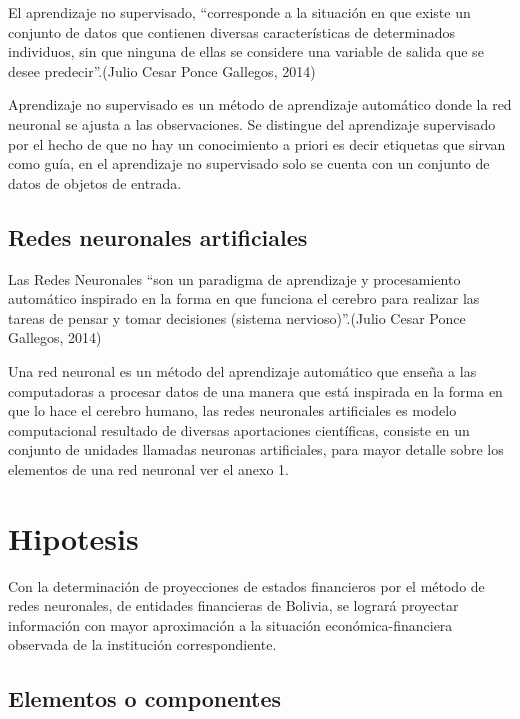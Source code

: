 \documentclass[
  12pt,
]{article}
\begin{document}
El aprendizaje no supervisado, ``corresponde a la situación en que
existe un conjunto de datos que contienen diversas características de
determinados individuos, sin que ninguna de ellas se considere una
variable de salida que se desee predecir''.(Julio Cesar Ponce Gallegos,
2014)

Aprendizaje no supervisado es un método de aprendizaje automático donde
la red neuronal se ajusta a las observaciones. Se distingue del
aprendizaje supervisado por el hecho de que no hay un conocimiento a
priori es decir etiquetas que sirvan como guía, en el aprendizaje no
supervisado solo se cuenta con un conjunto de datos de objetos de
entrada.

\hypertarget{redes-neuronales-artificiales}{%
\subsection{Redes neuronales
artificiales}\label{redes-neuronales-artificiales}}

Las Redes Neuronales ``son un paradigma de aprendizaje y procesamiento
automático inspirado en la forma en que funciona el cerebro para
realizar las tareas de pensar y tomar decisiones (sistema
nervioso)''.(Julio Cesar Ponce Gallegos, 2014)

Una red neuronal es un método del aprendizaje automático que enseña a
las computadoras a procesar datos de una manera que está inspirada en la
forma en que lo hace el cerebro humano, las redes neuronales
artificiales es modelo computacional resultado de diversas aportaciones
científicas, consiste en un conjunto de unidades llamadas neuronas
artificiales, para mayor detalle sobre los elementos de una red neuronal
ver el anexo 1.

\hypertarget{hipotesis}{%
\section{Hipotesis}\label{hipotesis}}

Con la determinación de proyecciones de estados financieros por el
método de redes neuronales, de entidades financieras de Bolivia, se
logrará proyectar información con mayor aproximación a la situación
económica-financiera observada de la institución correspondiente.

\hypertarget{elementos-o-componentes}{%
\subsection{Elementos o componentes}\label{elementos-o-componentes}}
\end{document}
